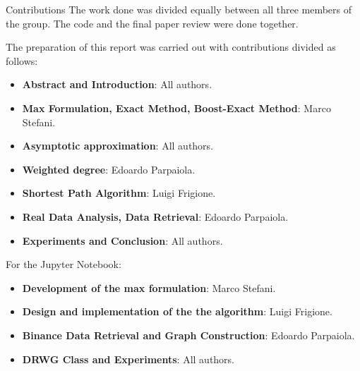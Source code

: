 \begin{projsection}{Contributions}
	The work done was divided equally between all three members of the group. The code and the final paper review were done together.
	
	The preparation of this report was carried out with contributions divided as follows:
	\begin{itemize}
		\item \textbf{Abstract and Introduction}: All authors.
		\item \textbf{Max Formulation, Exact Method, Boost-Exact Method}: Marco Stefani.
		\item \textbf{Asymptotic approximation}: All authors.
		\item \textbf{Weighted degree}: Edoardo Parpaiola.
		\item \textbf{Shortest Path Algorithm}: Luigi Frigione.
		\item \textbf{Real Data Analysis, Data Retrieval}: Edoardo Parpaiola.
		\item \textbf{Experiments and Conclusion}: All authors. 
	\end{itemize}
	For the Jupyter Notebook:
	\begin{itemize}
		\item \textbf{Development of the max formulation}: Marco Stefani.
		\item \textbf{Design and implementation of the the algorithm}: Luigi Frigione.
		\item \textbf{Binance Data Retrieval and Graph Construction}: Edoardo Parpaiola.
		\item \textbf{DRWG Class and Experiments}: All authors.
	\end{itemize}

\end{projsection}

